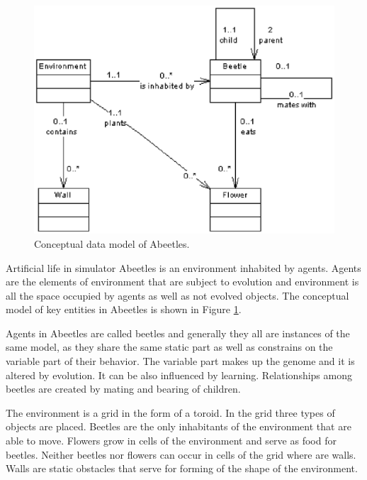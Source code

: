 \documentclass[a4paper,12pt]{report}
\begin{document}
\begin{figure}
\begin{center}
  \includegraphics [scale=0.8]{images/AnalysisDataModel.eps} 
  \caption{Conceptual data model of Abeetles.}
  \label{obr.AnalysisDataModel}
\end{center}
\end{figure}

Artificial life in simulator Abeetles is an environment inhabited by agents. Agents are the elements of environment that are subject to evolution and environment is all the space occupied by agents as well as not evolved objects. The conceptual model of key entities in Abeetles is shown in Figure \ref{obr.AnalysisDataModel}.

Agents in Abeetles are called beetles and generally they all are instances of the same model, as they share the same static part as well as constrains on the variable part of their behavior. The variable part makes up the genome and it is altered by evolution. It can be also influenced by learning. Relationships among beetles are created by mating and bearing of children. 

The environment is a grid in the form of a toroid. In the grid three types of objects are placed. Beetles are the only inhabitants of the environment that are able to move. Flowers grow in cells of the environment and serve as food for beetles. Neither beetles nor flowers can occur in cells of the grid where are walls. Walls are static obstacles that serve for forming of the shape of the environment.
\end{document}
